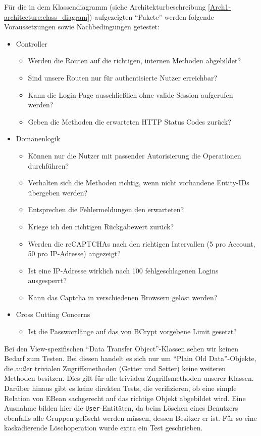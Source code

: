 \documentclass[12pt,DIV14,BCOR10mm,a4paper,parskip=half-,headsepline,headinclude,english,ngerman,bibliography=totocnumbered]{scrreprt}
\begin{document}

Für die in dem Klassendiagramm (siehe Architekturbeschreibung \ref{Arch1-architecture:class_diagram}) aufgezeigten \enquote{Pakete} werden folgende Voraussetzungen sowie Nachbedingungen getestet:

\begin{itemize}
  \item Controller
  \begin{itemize}
    \item Werden die Routen auf die richtigen, internen Methoden abgebildet?
    \item Sind unsere Routen nur für authentisierte Nutzer erreichbar?
    \item Kann die Login-Page ausschließlich ohne valide Session aufgerufen werden?
    \item Geben die Methoden die erwarteten HTTP Status Codes zurück?
  \end{itemize}

  \item Domänenlogik
  \begin{itemize}
    \item Können nur die Nutzer mit passender Autorisierung die Operationen durch\-führen?
    \item Verhalten sich die Methoden richtig, wenn nicht vorhandene Entity-IDs über\-geben werden?
    \item Entsprechen die Fehlermeldungen den erwarteten?
    \item Kriege ich den richtigen Rückgabewert zurück?
    \item Werden die reCAPTCHAs nach den richtigen Intervallen (5 pro Account, 50 pro IP-Adresse) angezeigt?
    \item Ist eine IP-Adresse wirklich nach 100 fehlgeschlagenen Logins ausgesperrt?
    \item Kann das Captcha in verschiedenen Browsern gelöst werden?
  \end{itemize}

  \item Cross Cutting Concerns
  \begin{itemize}
    \item Ist die Passwortlänge auf das von BCrypt vorgebene Limit gesetzt?
  \end{itemize}
\end{itemize}

Bei den View-spezifischen \enquote{Data Transfer Object}-Klassen sehen wir keinen Bedarf zum Testen.
Bei diesen handelt es sich nur um \enquote{Plain Old Data}-Objekte, die außer trivialen Zugriffsmethoden (Getter und Setter) keine weiteren Methoden besitzen.
Dies gilt für alle trivialen Zugriffsmethoden unserer Klassen. \newline
Darüber hinaus gibt es keine direkten Tests, die verifizieren, ob eine simple Relation von EBean sachgerecht auf das richtige Objekt abgebildet wird.
Eine Ausnahme bilden hier die \texttt{User}-Entitäten, da beim Löschen eines Benutzers ebenfalls alle Gruppen gelöscht werden müssen, dessen Besitzer er ist. Für so eine kaskadierende Löschoperation wurde extra ein Test geschrieben.
\end{document}
